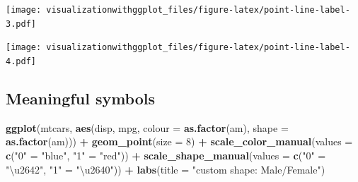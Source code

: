 \documentclass[]{krantz}
\makeatletter
\newenvironment{Shaded}{\begin{snugshade}}{\end{snugshade}}
\newcommand{\CommentTok}[1]{\textcolor[rgb]{0.56,0.35,0.01}{\textit{#1}}}
\newcommand{\DataTypeTok}[1]{\textcolor[rgb]{0.13,0.29,0.53}{#1}}
\newcommand{\DecValTok}[1]{\textcolor[rgb]{0.00,0.00,0.81}{#1}}
\newcommand{\KeywordTok}[1]{\textcolor[rgb]{0.13,0.29,0.53}{\textbf{#1}}}
\newcommand{\NormalTok}[1]{#1}
\newcommand{\OperatorTok}[1]{\textcolor[rgb]{0.81,0.36,0.00}{\textbf{#1}}}
\newcommand{\OtherTok}[1]{\textcolor[rgb]{0.56,0.35,0.01}{#1}}
\newcommand{\StringTok}[1]{\textcolor[rgb]{0.31,0.60,0.02}{#1}}
\newenvironment{kframe}{%
\medskip{}
\setlength{\fboxsep}{.8em}
 \def\at@end@of@kframe{}%
 \ifinner\ifhmode%
  \def\at@end@of@kframe{\end{minipage}}%
  \begin{minipage}{\columnwidth}%
 \fi\fi%
 \def\FrameCommand##1{\hskip\@totalleftmargin \hskip-\fboxsep
 \colorbox{shadecolor}{##1}\hskip-\fboxsep
     \hskip-\linewidth \hskip-\@totalleftmargin \hskip\columnwidth}%
 \MakeFramed {\advance\hsize-\width
   \@totalleftmargin\z@ \linewidth\hsize
   \@setminipage}}%
 {\par\unskip\endMakeFramed%
 \at@end@of@kframe}
\renewenvironment{Shaded}{\begin{kframe}}{\end{kframe}}
\makeatother
\begin{document}
\texttt{[image: visualizationwithggplot\_files/figure-latex/point-line-label-3.pdf]}

\begin{Shaded}
\end{Shaded}

\texttt{[image: visualizationwithggplot\_files/figure-latex/point-line-label-4.pdf]}

\hypertarget{meaningful-symbols}{%
\subsection{Meaningful symbols}\label{meaningful-symbols}}

\begin{Shaded}
\begin{Highlighting}[]
\KeywordTok{ggplot}\NormalTok{(mtcars, }
        \KeywordTok{aes}\NormalTok{(disp,  mpg, }\DataTypeTok{colour =} \KeywordTok{as.factor}\NormalTok{(am), }\DataTypeTok{shape =} \KeywordTok{as.factor}\NormalTok{(am))) }\OperatorTok{+}
\StringTok{  }\KeywordTok{geom_point}\NormalTok{(}\DataTypeTok{size =} \DecValTok{8}\NormalTok{) }\OperatorTok{+}\StringTok{   }
\StringTok{    }\KeywordTok{scale_color_manual}\NormalTok{(}\DataTypeTok{values =} \KeywordTok{c}\NormalTok{(}\StringTok{"0"}\NormalTok{ =}\StringTok{ "blue"}\NormalTok{, }\StringTok{"1"}\NormalTok{ =}\StringTok{ "red"}\NormalTok{)) }\OperatorTok{+}\StringTok{  }
\StringTok{  }\KeywordTok{scale_shape_manual}\NormalTok{(}\DataTypeTok{values =} \KeywordTok{c}\NormalTok{(}\StringTok{"0"}\NormalTok{ =}\StringTok{ "\textbackslash{}u2642"}\NormalTok{, }\StringTok{"1"}\NormalTok{ =}\StringTok{ "\textbackslash{}u2640"}\NormalTok{)) }\OperatorTok{+}\StringTok{  }
\StringTok{  }\KeywordTok{labs}\NormalTok{(}\DataTypeTok{title =} \StringTok{"custom shape: Male/Female"}\NormalTok{)}
\end{Highlighting}
\end{Shaded}
\end{document}
